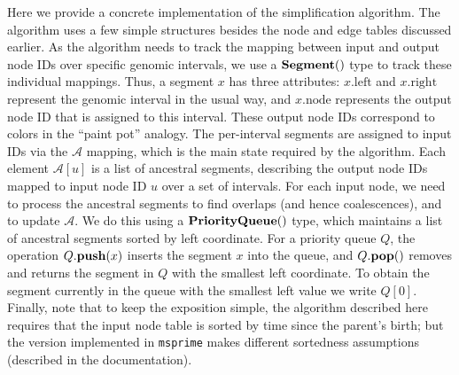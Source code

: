 \documentclass{article}
\newcommand{\msprime}{\texttt{msprime}}
\newcommand{\Al}{\mathcal{A}}  %
\newcommand{\priorityq}[1]{\mbox{\textbf{PriorityQueue}}({#1})}
\newcommand{\pqpush}[2]{#1.\mbox{\textbf{push}}(#2)}
\newcommand{\pqpop}[1]{#1.\mbox{\textbf{pop}}()}
\newcommand{\ancsegment}[1]{\mbox{\textbf{Segment}}(#1)}
\newcommand{\attrleft}[1]{#1.\mbox{left}}
\newcommand{\attrright}[1]{#1.\mbox{right}}
\newcommand{\attrnode}[1]{#1.\mbox{node}}
\begin{document}
Here we provide a concrete implementation of the simplification algorithm.
The algorithm uses a few simple structures
besides the node and edge tables discussed earlier. As the algorithm needs to track the mapping
between input and output node IDs over specific genomic intervals, we use a $\ancsegment$
type to track these individual mappings. Thus, a segment $x$ has three attributes:
$\attrleft{x}$ and $\attrright{x}$ represent the genomic interval in the usual way,
and $\attrnode{x}$ represents the output node ID that is assigned to this interval.
These output node IDs correspond to colors in the ``paint pot'' analogy.
The per-interval segments are assigned to input IDs via the $\Al$ mapping,
which is the main state required by the algorithm. Each element $\Al[u]$
is a list of ancestral segments, describing the output node IDs mapped to input
node ID $u$ over a set of intervals.
For each input node, we need to process the ancestral segments
to find overlaps (and hence coalescences), and to update $\Al$.
We do this using a $\priorityq{}$ type, which maintains a list of ancestral
segments sorted by left coordinate. For a priority queue $Q$, the operation
$\pqpush{Q}{x}$ inserts the segment $x$ into the queue, and $\pqpop{Q}$
removes and returns the segment in $Q$ with the smallest left coordinate.
To obtain the segment currently in the queue with the smallest left value we
write $Q[0]$.
Finally, note that to keep the exposition simple,
the algorithm described here requires that the input node table
is sorted by time since the parent's birth;
but the version implemented in \msprime{} makes different sortedness assumptions
(described in the documentation).
\end{document}
